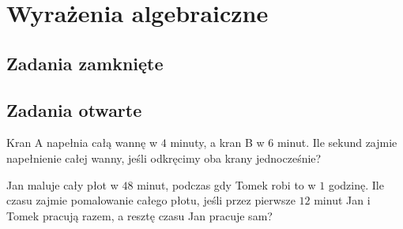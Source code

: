 \setcounter{parc}{0}
\addtocounter{chapc}{1}

\chapter{Wyrażenia algebraiczne}

\section{Zadania zamknięte}

\section{Zadania otwarte}

\zadanie Kran A napełnia całą wannę w $4$ minuty, a kran B w $6$ minut. Ile sekund zajmie napełnienie całej wanny, jeśli odkręcimy oba krany jednocześnie?

\zadanie Jan maluje cały płot w $48$ minut, podczas gdy Tomek robi to w $1$ godzinę. Ile czasu zajmie pomalowanie całego płotu, jeśli przez pierwsze $12$ minut Jan i Tomek pracują razem, a resztę czasu Jan pracuje sam?